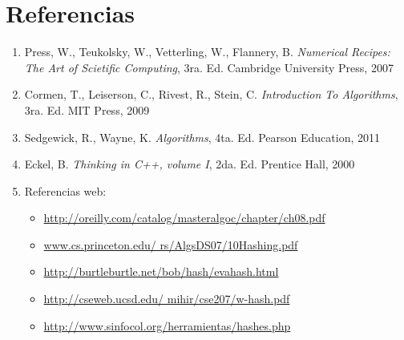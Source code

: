 \documentclass[letterpaper]{article}
\begin{document}
\section{Referencias}

\begin{enumerate}

\item Press, W., Teukolsky, W., Vetterling, W., Flannery, B. \textit{Numerical Recipes: The Art of Scietific Computing}, 3ra. Ed. Cambridge University Press, 2007
\item Cormen, T., Leiserson, C., Rivest, R., Stein, C. \textit{Introduction To Algorithms}, 3ra. Ed. MIT Press, 2009
\item Sedgewick, R., Wayne, K. \textit{Algorithms}, 4ta. Ed. Pearson Education, 2011
\item Eckel, B. \textit{Thinking in C++, volume I}, 2da. Ed. Prentice Hall, 2000
\item Referencias web: \begin{itemize}
	\item \url{http://oreilly.com/catalog/masteralgoc/chapter/ch08.pdf}
	\item \url{www.cs.princeton.edu/ rs/AlgsDS07/10Hashing.pdf}
	\item \url{http://burtleburtle.net/bob/hash/evahash.html}
	\item \url{http://cseweb.ucsd.edu/ mihir/cse207/w-hash.pdf}
	\item \url{http://www.sinfocol.org/herramientas/hashes.php}
	\end{itemize}

\end{enumerate}
	
\end{document}
